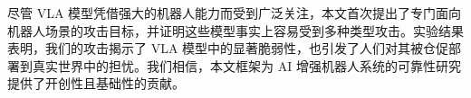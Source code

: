 
\begin{conclusion}
尽管 VLA 模型凭借强大的机器人能力而受到广泛关注，本文首次提出了专门面向机器人场景的攻击目标，并证明这些模型事实上容易受到多种类型攻击。实验结果表明，我们的攻击揭示了 VLA 模型中的显著脆弱性，也引发了人们对其被仓促部署到真实世界中的担忧。我们相信，本文框架为 AI 增强机器人系统的可靠性研究提供了开创性且基础性的贡献。
\end{conclusion}
